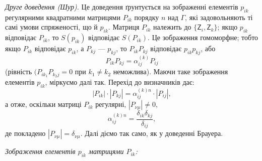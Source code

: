 \documentclass[11pt]{article}
\begin{document}
\emph{Друге доведення (Шур).} Це доведення ґрунтується на зображенні елементів \(p_{ik}\) регулярними квадратними матрицями \(P_{ik}\) порядку \(n\) над \(\Gamma\), які задовольняють ті самі умови спряженості, що й \(p_{ik}\). Матриця \(P_{ik}\) належить до \(\{\mathsf{Z}_i,\mathsf{Z}_k\}\); якщо \(p_{ik}\) відповідає \(P_{ik}\), то \(S(p_{ik})\) відповідає \(S(P_{ik})\). Це зображення гомоморфне; тобто якщо \(P_{ik}\) відповідає \(p_{ik}\), а \(P_{kj}\) --- \(p_{kj}\), то \(P_{ik}P_{kj}\) відповідає \(p_{ik}p_{kj}\), або
\[
P_{ik}P_{kj}=\alpha_{ij}^{(k)}P_{ij}
\]
(рівність \((P_{ik_1}P_{k_2j}=0\) при \(k_1\neq k_2\) неможлива). Маючи таке зображення елементів \(p_{ik}\), міркуємо далі так. Перехід до визначників дає:
\[
|P_{ik}|\cdot |P_{kj}|=\alpha_{ij}^{(k)n}\cdot |P_{ij}|,
\]
а отже, оскільки матриці \(P_{ik}\) регулярні, \(|P_{\nu\mu}|\ne0\),
\[
\alpha_{ij}^{(k)n}=\frac{\delta_{ik}\delta_{kj}}{\delta_{ij}},
\]
де покладено \(|P_{\nu\mu}|=\delta_{\nu\mu}\). Далі діємо так само, як у доведенні Брауера.

\emph{Зображення елементів \(p_{ik}\) матрицями \(P_{ik}\):}
\end{document}

